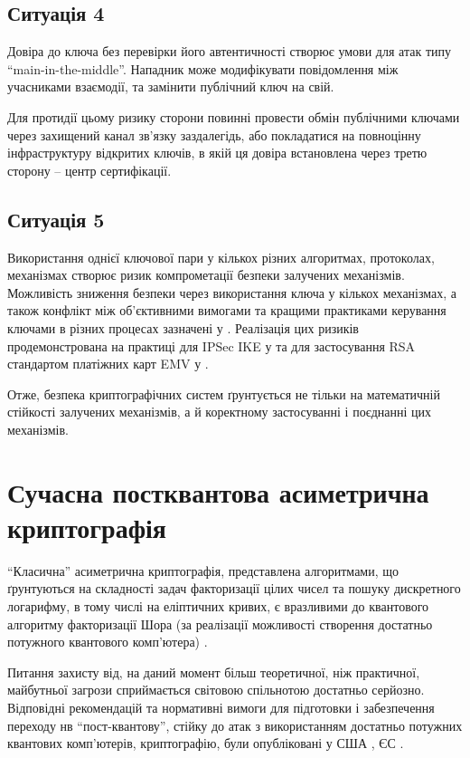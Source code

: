 \documentclass{kpi-lab}
\begin{document}
\section{Ситуація 4}

Довіра до ключа без перевірки його автентичності створює
умови для атак типу \enquote{main-in-the-middle}. Нападник
може модифікувати повідомлення між учасниками взаємодії, та
замінити публічний ключ на свій.

Для протидії цьому ризику
сторони повинні провести обмін публічними ключами через
захищений канал зв'язку заздалегідь, або покладатися на
повноцінну інфраструктуру відкритих ключів, в якій ця
довіра встановлена через третю сторону -- центр сертифікації.

\section{Ситуація 5}

Використання однієї ключової пари у кількох різних
алгоритмах, протоколах, механізмах створює ризик компрометації
безпеки залучених механізмів.
Можливість зниження безпеки через використання ключа у
кількох механізмах,
а також конфлікт між об'єктивними вимогами та кращими
практиками керування ключами в різних процесах зазначені у
\cite{nist-sp-800-57pt1r5}.
Реалізація цих ризиків продемонстрована на практиці
для IPSec IKE у \cite{usenix-27-sec-18-key-reuse-ipsec-ike}
та для застосування RSA стандартом платіжних карт EMV у
\cite{Degabriele2012}.

Отже, безпека криптографічних систем ґрунтується не тільки
на математичній стійкості залучених механізмів, а й
коректному застосуванні і поєднанні цих механізмів.

\chapter{Сучасна постквантова асиметрична криптографія}

\enquote{Класична} асиметрична криптографія, представлена
алгоритмами, що ґрунтуються на складності задач факторизації
цілих чисел та пошуку дискретного логарифму, в тому числі
на еліптичних кривих, є вразливими до квантового алгоритму
факторизації Шора (за реалізації можливості створення
достатньо потужного квантового комп'ютера) \cite{nist-ir-8547}.

Питання захисту від, на даний момент більш теоретичної, ніж
практичної, майбутньої загрози сприймається світовою
спільнотою достатньо серйозно. Відповідні рекомендацій та
нормативні вимоги для підготовки і забезпечення переходу нв
\enquote{пост-квантову}, стійку до атак з використанням
достатньо потужних квантових комп'ютерів,
криптографію, були опубліковані у США \cite{us-eo-14412},
ЄС \cite{eu-ec-cr-pqc}.
\end{document}
